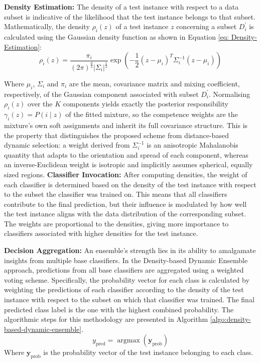 \documentclass[lettersize,journal]{IEEEtran}
\begin{document}
	\textbf{Density Estimation:} The density of a test instance with respect to a data subset is indicative of the likelihood that the test instance belongs to that subset. Mathematically, the density $\rho_i(z)$ of a test instance $z$ concerning a subset $D_i^{\prime}$ is calculated using the Gaussian density function as shown in Equation \ref{eq: Density-Estimation}:
	\begin{equation}\label{eq: Density-Estimation}
		\rho_i(z)=\frac{\pi_i}{(2 \pi)^{\frac{d}{2}}\left|\Sigma_i\right|^{\frac{1}{2}}} \exp \left(-\frac{1}{2}\left(z-\mu_i\right)^T \Sigma_i^{-1}\left(z-\mu_i\right)\right)
	\end{equation}
	
	Where $\mu_i$, $\Sigma_i$ and $\pi_i$ are the mean, covariance matrix and mixing
	coefficient, respectively, of the Gaussian component associated with subset
	$D_i^{\prime}$. Normalising $\rho_i(z)$ over the $K$ components yields exactly the
	posterior responsibility $\gamma_i(z) = P(i \mid z)$ of the fitted mixture, so the
	competence weights are the mixture's own soft assignments and inherit its full
	covariance structure. This is the property that distinguishes the proposed scheme from
	distance-based dynamic selection: a weight derived from $\Sigma_i^{-1}$ is an
	anisotropic Mahalanobis quantity that adapts to the orientation and spread of each
	component, whereas an inverse-Euclidean weight is isotropic and implicitly assumes
	spherical, equally sized regions.
	\textbf{Classifier Invocation:} After computing densities, the weight of each classifier is determined based on the density of the test instance with respect to the subset the classifier was trained on. This means that all classifiers contribute to the final prediction, but their influence is modulated by how well the test instance aligns with the data distribution of the corresponding subset. The weights are proportional to the densities, giving more importance to classifiers associated with higher densities for the test instance.
	
	\textbf{Decision Aggregation:} An ensemble's strength lies in its ability to amalgamate insights from multiple base classifiers. In the Density-based Dynamic Ensemble approach, predictions from all base classifiers are aggregated using a weighted voting scheme. Specifically, the probability vector for each class is calculated by weighting the predictions of each classifier according to the density of the test instance with respect to the subset on which that classifier was trained. The final predicted class label is the one with the highest combined probability. The algorithmic steps for this methodology are presented in Algorithm \ref{algo:density-based-dynamic-ensemble}.
	\begin{equation}
		y_{\text{pred}} = \operatorname{argmax}\left(\mathbf{y}_{\text{prob}}\right)
	\end{equation}
	Where $\mathbf{y}_{\text{prob}}$ is the probability vector of the test instance belonging to each class.
	
\end{document}
